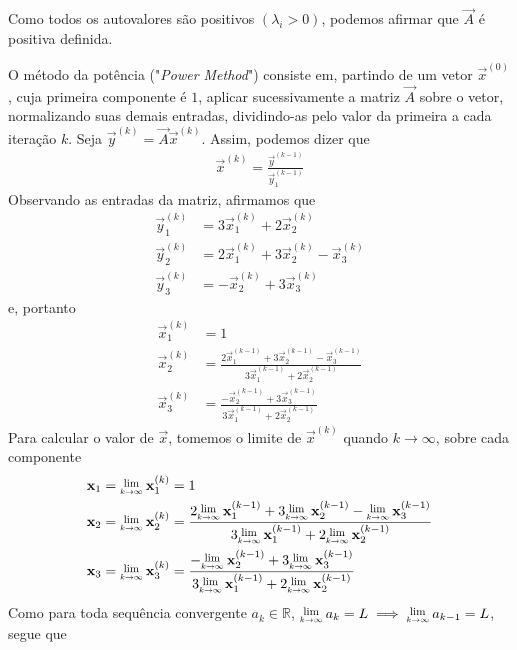 \documentclass{homework}
\begin{document}
		
		\subsubquest Como todos os autovalores são positivos $(\lambda_i > 0)$, podemos afirmar que $\vec{A}$ é positiva definida.
		
		\subsubquest O método da potência ("\textit{Power Method}") consiste em, partindo de um vetor $\vec{x}^{(0)}$, cuja primeira componente é $1$, aplicar sucessivamente a matriz $\vec{A}$ sobre o vetor, normalizando suas demais entradas, dividindo-as pelo valor da primeira a cada iteração $k$. Seja $\vec{y}^{(k)} = \vec{A} \vec{x}^{(k)}$. Assim, podemos dizer que
			\begin{align*}
				\vec{x}^{(k)} = \frac{\vec{y}^{(k-1)}}{\vec{y}_1^{(k-1)}}
			\end{align*}
		Observando as entradas da matriz, afirmamos que
			\begin{align*}
				\vec{y}_1^{(k)} &= 3 \vec{x}_1^{(k)} + 2 \vec{x}_2^{(k)}\\
				\vec{y}_2^{(k)} &= 2 \vec{x}_1^{(k)} + 3 \vec{x}_2^{(k)} - \vec{x}_3^{(k)}\\
				\vec{y}_3^{(k)} &= - \vec{x}_2^{(k)} + 3 \vec{x}_3^{(k)}
			\end{align*}
		e, portanto
			\begin{align*}
			\vec{x}_1^{(k)} &= 1\\
			\vec{x}_2^{(k)} &= \frac{2 \vec{x}_1^{(k-1)} + 3 \vec{x}_2^{(k-1)} - \vec{x}_3^{(k-1)}}{3 \vec{x}_1^{(k-1)} + 2 \vec{x}_2^{(k-1)}}\\
			\vec{x}_3^{(k)} &= \frac{- \vec{x}_2^{(k-1)} + 3 \vec{x}_3^{(k-1)}}{3 \vec{x}_1^{(k-1)} + 2 \vec{x}_2^{(k-1)}}
			\end{align*}
		Para calcular o valor de $\vec{x}$, tomemos o limite de $\vec{x}^{(k)}$ quando $k \to \infty$, sobre cada componente
			\begin{align*}
				\vec{x}_1 &= \Lim{k \to \infty} \vec{x}_1^{(k)} = 1\\
				\vec{x}_2 &= \Lim{k \to \infty} \vec{x}_2^{(k)} = \frac{2 \Lim{k \to \infty} \vec{x}_1^{(k-1)} + 3 \Lim{k \to \infty} \vec{x}_2^{(k-1)} - \Lim{k \to \infty} \vec{x}_3^{(k-1)}}{3 \Lim{k \to \infty} \vec{x}_1^{(k-1)} + 2 \Lim{k \to \infty} \vec{x}_2^{(k-1)}}\\
				\vec{x}_3 &= \Lim{k \to \infty} \vec{x}_3^{(k)} = \frac{- \Lim{k \to \infty} \vec{x}_2^{(k-1)} + 3 \Lim{k \to \infty} \vec{x}_3^{(k-1)}}{3 \Lim{k \to \infty} \vec{x}_1^{(k-1)} + 2 \Lim{k \to \infty} \vec{x}_2^{(k-1)}}
			\end{align*}
		Como para toda sequência convergente $a_k \in \mathbb{R}$, $\Lim{k \to \infty} a_k = L \implies \Lim{k \to \infty} a_{k - 1} = L$, segue que
\end{document}

